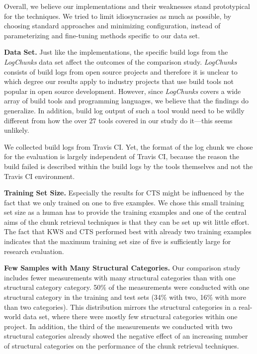 Overall, we believe our implementations and their weaknesses stand
prototypical for the techniques.
We tried to limit idiosyncrasies as
much as possible, by choosing standard approaches and minimizing
configuration, instead of parameterizing and fine-tuning methods
specific to our data set.

\textbf{Data Set.}
Just like the implementations, the specific build logs from the
\emph{LogChunks} data set affect
the outcomes of the comparison study.
\emph{LogChunks} consists of build
logs from open source projects and therefore it is unclear to which
degree our results apply to industry projects that use build tools not
popular in open source development.
However, since \emph{LogChunks}
covers a wide array of build tools and programming languages, we
believe that the findings do generalize.
In addition, build log output
of such a tool would need to be wildly different from how the over 27
tools covered in our study do it---this seems unlikely.

We collected build logs from
Travis CI.
Yet, the format of the log chunk we chose for the
evaluation is largely independent of Travis CI\@, because the reason
the build failed is described within the build logs by the tools
themselves and not the Travis CI environment.

\textbf{Training Set Size.}
Especially the results for CTS might be influenced by the fact that we
only trained on one to five examples.
We chose this small training
set size as a human has to provide the training examples and one of
the central aims of the chunk retrieval techniques is that they can be
set up wit little effort.
The fact that KWS and CTS performed best
with already two training examples indicates that the maximum training
set size of five is sufficiently large for research evaluation.

\textbf{Few Samples with Many Structural Categories.}
Our comparison study includes fewer measurements with many structural
categories than with one structural category category.
50\% of the measurements were conducted with one structural category
in the training and test sets
(34\% with two, 16\% with more than two categories).
This distribution mirrors the
structural categories in a real-world data set, where there were
mostly few structural categories within one project.
In addition, the
third of the measurements we conducted with two structural categories
already showed the negative effect of an increasing number of
structural categories on the performance of the chunk retrieval
techniques.

